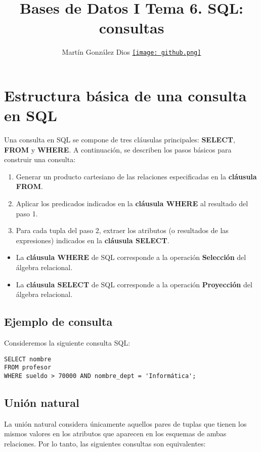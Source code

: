 \documentclass{article}
\title{Bases de Datos I Tema 6. SQL: consultas}
\author{Martín González Dios 
\href{https://github.com/martindios}{\texttt{[image: github.png]}}}
\begin{document}
\maketitle

\section{Estructura básica de una consulta en SQL}

Una consulta en SQL se compone de tres cláusulas principales: \textbf{SELECT}, \textbf{FROM} y \textbf{WHERE}. A continuación, se describen los pasos básicos para construir una consulta:

\begin{enumerate}
    \item Generar un producto cartesiano de las relaciones especificadas en la \textbf{cláusula FROM}.
    \item Aplicar los predicados indicados en la \textbf{cláusula WHERE} al resultado del paso 1.
    \item Para cada tupla del paso 2, extraer los atributos (o resultados de las expresiones) indicados en la \textbf{cláusula SELECT}.
\end{enumerate}

\begin{itemize}
    \item La \textbf{cláusula WHERE} de SQL corresponde a la operación \textbf{Selección} del álgebra relacional.
    \item La \textbf{cláusula SELECT} de SQL corresponde a la operación \textbf{Proyección} del álgebra relacional.
\end{itemize}

\subsection{Ejemplo de consulta}
Consideremos la siguiente consulta SQL:

\begin{verbatim}
SELECT nombre 
FROM profesor 
WHERE sueldo > 70000 AND nombre_dept = 'Informática';
\end{verbatim}

\subsection{Unión natural}
La unión natural considera únicamente aquellos pares de tuplas que tienen los mismos valores en los atributos que aparecen en los esquemas de ambas relaciones. Por lo tanto, las siguientes consultas son equivalentes:
\end{document}
